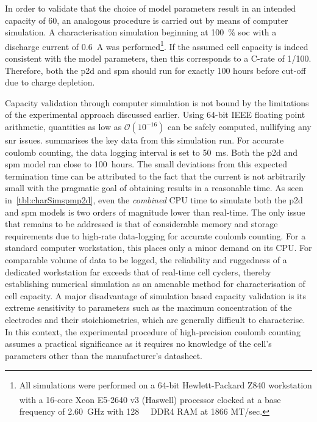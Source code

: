 In order to validate  that the choice of model parameters  result in an intended
capacity  of  \SI{60}{\amphour},  an  analogous  procedure  is  carried  out  by
means  of  computer  simulation.  A  characterisation  simulation  beginning  at
\SI{100}{\percent} \gls{soc}  with a discharge current  of \SI{0.6}{\ampere} was
performed\footnote{All simulations  were performed  on a  64-bit Hewlett-Packard
Z840  workstation with  a 16-core  \textsuperscript{\textregistered}
Xeon\textsuperscript{\textregistered} E5-2640 v3  (Haswell) processor clocked at
a base frequency of \SI{2.60}{\giga\hertz} with \SI{128}{\giga\byte} DDR4 RAM at
1866 MT/sec.}. If the assumed cell  capacity is indeed consistent with the model
parameters, then  this corresponds  to a  C-rate of  1/100. Therefore,  both the
\gls{p2d} and \gls{spm}  should run for exactly 100 hours  before cut-off due to
charge depletion.



Capacity validation through computer simulation  is not bound by the limitations
of the experimental approach discussed earlier. Using 64-bit IEEE floating point
arithmetic, quantities as low as $\mathcal{O}(10^{-16})$ can be safely computed,
nullifying  any \gls{snr}  issues.   summarises the  key
data  from  this  simulation  run.  For  accurate  coulomb  counting,  the  data
logging  interval  is set  to  \SI{50}{\milli\second}.  Both the  \gls{p2d}  and
\gls{spm} model ran close to 100~hours.  The small deviations from this expected
termination  time  can  be attributed  to  the  fact  that  the current  is  not
arbitrarily small with  the pragmatic goal of obtaining results  in a reasonable
time. As seen in~\cref{tbl:charSimspmp2d}, even  the \emph{combined} CPU time to
simulate both  the \gls{p2d}  and \gls{spm}  models is  two orders  of magnitude
lower than  real-time. The only  issue that remains to  be addressed is  that of
considerable memory and  storage requirements due to  high-rate data-logging for
accurate coulomb counting. For a standard computer workstation, this places only
a minor  demand on  its CPU.  For comparable volume  of data  to be  logged, the
reliability  and ruggedness  of  a  dedicated workstation  far  exceeds that  of
real-time cell cyclers, thereby establishing numerical simulation as an amenable
method for characterisation of cell capacity. A major disadvantage of simulation
based capacity validation  is its extreme sensitivity to parameters  such as the
maximum concentration  of the  electrodes and  their stoichiometries,  which are
generally difficult to characterise. In this context, the experimental procedure
of  high-precision  coulomb counting  assumes  a  practical significance  as  it
requires no  knowledge of  the cell's parameters  other than  the manufacturer's
datasheet.

